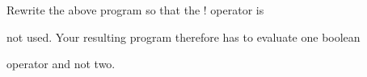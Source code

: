 Rewrite the above program so that the ! operator is

not used. Your resulting program therefore has to evaluate one boolean

operator and not two.

